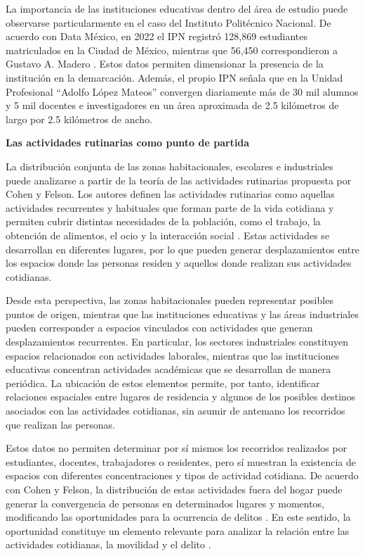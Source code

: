 La importancia de las instituciones educativas dentro del área de estudio puede observarse particularmente en el caso del Instituto Politécnico Nacional. De acuerdo con Data México, en 2022 el IPN registró 128,869 estudiantes matriculados en la Ciudad de México, mientras que 56,450 correspondieron a Gustavo A. Madero \cite{datamexico_ipn}. Estos datos permiten dimensionar la presencia de la institución en la demarcación. Además, el propio IPN señala que en la Unidad Profesional ``Adolfo López Mateos'' convergen diariamente más de 30 mil alumnos y 5 mil docentes e investigadores en un área aproximada de 2.5 kilómetros de largo por 2.5 kilómetros de ancho\cite{ipn2022}.

\textbf{Las actividades rutinarias como punto de partida} \

La distribución conjunta de las zonas habitacionales, escolares e industriales puede analizarse a partir de la teoría de las actividades rutinarias propuesta por Cohen y Felson. Los autores definen las actividades rutinarias como aquellas actividades recurrentes y habituales que forman parte de la vida cotidiana y permiten cubrir distintas necesidades de la población, como el trabajo, la obtención de alimentos, el ocio y la interacción social \cite{cohenfelson1979}. Estas actividades se desarrollan en diferentes lugares, por lo que pueden generar desplazamientos entre los espacios donde las personas residen y aquellos donde realizan sus actividades cotidianas.

Desde esta perspectiva, las zonas habitacionales pueden representar posibles puntos de origen, mientras que las instituciones educativas y las áreas industriales pueden corresponder a espacios vinculados con actividades que generan desplazamientos recurrentes. En particular, los sectores industriales constituyen espacios relacionados con actividades laborales, mientras que las instituciones educativas concentran actividades académicas que se desarrollan de manera periódica. La ubicación de estos elementos permite, por tanto, identificar relaciones espaciales entre lugares de residencia y algunos de los posibles destinos asociados con las actividades cotidianas, sin asumir de antemano los recorridos que realizan las personas.

Estos datos no permiten determinar por sí mismos los recorridos realizados por estudiantes, docentes, trabajadores o residentes, pero sí muestran la existencia de espacios con diferentes concentraciones y tipos de actividad cotidiana. De acuerdo con Cohen y Felson, la distribución de estas actividades fuera del hogar puede generar la convergencia de personas en determinados lugares y momentos, modificando las oportunidades para la ocurrencia de delitos \cite{cohenfelson1979}. En este sentido, la oportunidad constituye un elemento relevante para analizar la relación entre las actividades cotidianas, la movilidad y el delito \cite{canopanos2018}.

